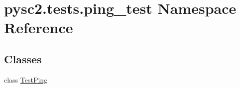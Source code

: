 \hypertarget{namespacepysc2_1_1tests_1_1ping__test}{}\section{pysc2.\+tests.\+ping\+\_\+test Namespace Reference}
\label{namespacepysc2_1_1tests_1_1ping__test}
\subsection*{Classes}
\begin{DoxyCompactItemize}
\item 
class \mbox{\hyperlink{classpysc2_1_1tests_1_1ping__test_1_1_test_ping}{Test\+Ping}}
\end{DoxyCompactItemize}
